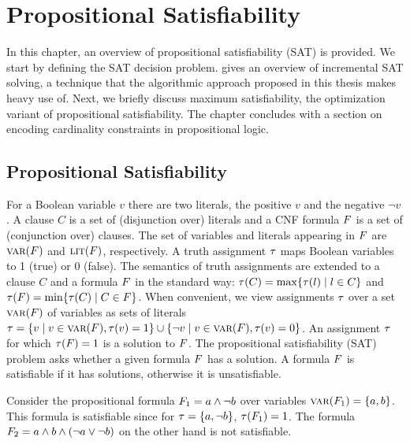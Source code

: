 \chapter{Propositional Satisfiability\label{chap:satisfiability}}

In this chapter, an overview of propositional satisfiability (SAT) is provided.
We start by defining the SAT decision problem.
 gives an overview of incremental SAT solving, a technique that the algorithmic approach proposed in this thesis makes heavy use of.
Next, we briefly discuss maximum satisfiability, the optimization variant of propositional satisfiability.
The chapter concludes with a section on encoding cardinality constraints in propositional logic.

\section{Propositional Satisfiability\label{sec:sat}}

For a Boolean variable $v$ there are two literals, the positive $v$ and the negative $\lnot v$. 
A clause $C$ is a set of (disjunction over) literals and a CNF formula $F$ is a set of (conjunction over) clauses.
The set of variables and literals appearing in $F$ are $\textsc{var}(F)$ and $\textsc{lit}(F)$, respectively.  
A truth assignment $\tau$ maps Boolean variables to 1 (true) or 0 (false).
The semantics of truth assignments are extended to a clause $C$ and a formula $F$ in the standard way: $\tau(C) = \max\{ \tau(l) \mid l \in C\}$ and $\tau(F) = \min\{\tau(C) \mid C \in F\}$.
When convenient, we view assignments $\tau$ over a set $\textsc{var}(F)$ of variables as sets of literals $\tau = \{ v \mid v \in \textsc{var}(F),  \tau(v) = 1\} \cup \{ \lnot v \mid v \in \textsc{var}(F), \tau(v) = 0\}$.
An assignment $\tau$ for which $\tau(F) = 1$ is a solution to $F$.
The propositional satisfiability (SAT) problem asks whether a given formula $F$ has a solution.
A formula $F$ is satisfiable if it has solutions, otherwise it is unsatisfiable.

\begin{example}
  Consider the propositional formula $F_1 = a \land \lnot b$ over variables $\textsc{var}(F_1) = \{a,b\}$.
  This formula is satisfiable since for $\tau=\{a,\lnot b\}$, $\tau(F_1)=1$.
  The formula $F_2 = a \land b \land (\lnot a \lor \lnot b)$ on the other hand is not satisfiable.
\end{example}

